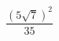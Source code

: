 \begin{ex}[type=calculate]
	\begin{condition}
		 \( \dfrac{(5\sqrt{7})^2}{35} \)
	\end{condition}
\end{ex}